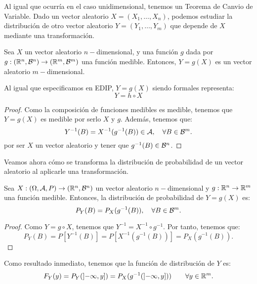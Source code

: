 Al igual que ocurría en el caso unidimensional, tenemos un Teorema de Canvio de Variable. Dado un vector aleatorio $X=(X_1, \ldots, X_n)$, podemos estudiar la distribución de otro vector aleatorio $Y=(Y_1, \ldots, Y_m)$ que depende de $X$ mediante una transformación.
\begin{prop}
    Sea $X$ un vector aleatorio $n-$dimensional, y una función $g$ dada por $g:\left(\mathbb{R}^n,\mathcal{B}^n\right)\to \left(\mathbb{R}^m,\mathcal{B}^m\right)$ una función medible. Entonces, $Y=g(X)$ es un vector aleatorio $m-$dimensional.
    \begin{observacion}
        Al igual que especificamos en EDIP, $Y=g(X)$ siendo formales representa:
        \begin{equation*}
            Y=h\circ X
        \end{equation*}
    \end{observacion}
\end{prop}
\begin{proof}
    Como la composición de funciones medibles es medible, tenemos que $Y=g(X)$ es medible por serlo $X$ y $g$. Además, tenemos que:
    \begin{equation*}
        Y^{-1}(B) = X^{-1}(g^{-1}(B))\in \mathcal{A}, \quad \forall B\in \mathcal{B}^m.
    \end{equation*}
    por ser $X$ un vector aleatorio y tener que $g^{-1}(B)\in \mathcal{B}^n$.
\end{proof}

Veamos ahora cómo se transforma la distribución de probabilidad de un vector aleatorio al aplicarle una transformación.
\begin{prop}
    Sea $X:(\Omega, \mathcal{A},P) \to (\mathbb{R}^n, \mathcal{B}^n)$ un vector aleatorio $n-$dimensional y $g:\mathbb{R}^n\to \mathbb{R}^m$ una función medible. Entonces, la distribución de probabilidad de $Y=g(X)$ es:
    \begin{equation*}
        P_Y(B) = P_X(g^{-1}(B)), \quad \forall B\in \mathcal{B}^m.
    \end{equation*}
\end{prop}
\begin{proof}
    Como $Y=g\circ X$, tenemos que $Y^{-1}=X^{-1}\circ g^{-1}$. Por tanto, tenemos que:
    \begin{equation*}
        P_Y(B) = P[Y^{-1}(B)] = P[X^{-1}(g^{-1}(B))] = P_X(g^{-1}(B)).
    \end{equation*}
\end{proof}

Como resultado inmediato, tenemos que la función de distribución de $Y$ es:
\begin{equation*}
    F_Y(y) = P_Y(\left]-\infty, y\right]) = P_X(g^{-1}(\left]-\infty, y\right]))   \qquad \forall y\in \mathbb{R}^m.
\end{equation*}

